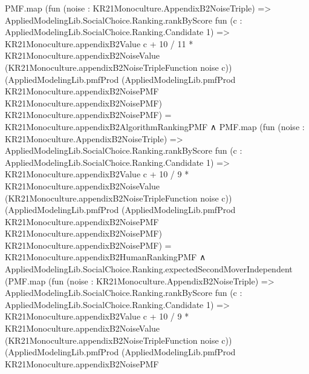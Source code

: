 \documentclass[10pt]{article}
\begin{document}
\begin{ReviewVerbatim}
                  PMF.map
                        (fun (noise : KR21Monoculture.AppendixB2NoiseTriple) =>
                          AppliedModelingLib.SocialChoice.Ranking.rankByScore
                            fun (c : AppliedModelingLib.SocialChoice.Ranking.Candidate 1) =>
                            KR21Monoculture.appendixB2Value c +
                              10 / 11 *
                                KR21Monoculture.appendixB2NoiseValue
                                  (KR21Monoculture.appendixB2NoiseTripleFunction noise c))
                        (AppliedModelingLib.pmfProd
                          (AppliedModelingLib.pmfProd KR21Monoculture.appendixB2NoisePMF
                            KR21Monoculture.appendixB2NoisePMF)
                          KR21Monoculture.appendixB2NoisePMF) =
                      KR21Monoculture.appendixB2AlgorithmRankingPMF ∧
                    PMF.map
                          (fun (noise : KR21Monoculture.AppendixB2NoiseTriple) =>
                            AppliedModelingLib.SocialChoice.Ranking.rankByScore
                              fun (c : AppliedModelingLib.SocialChoice.Ranking.Candidate 1) =>
                              KR21Monoculture.appendixB2Value c +
                                10 / 9 *
                                  KR21Monoculture.appendixB2NoiseValue
                                    (KR21Monoculture.appendixB2NoiseTripleFunction noise c))
                          (AppliedModelingLib.pmfProd
                            (AppliedModelingLib.pmfProd KR21Monoculture.appendixB2NoisePMF
                              KR21Monoculture.appendixB2NoisePMF)
                            KR21Monoculture.appendixB2NoisePMF) =
                        KR21Monoculture.appendixB2HumanRankingPMF ∧
                      AppliedModelingLib.SocialChoice.Ranking.expectedSecondMoverIndependent
                              (PMF.map
                                (fun (noise : KR21Monoculture.AppendixB2NoiseTriple) =>
                                  AppliedModelingLib.SocialChoice.Ranking.rankByScore
                                    fun (c : AppliedModelingLib.SocialChoice.Ranking.Candidate 1) =>
                                    KR21Monoculture.appendixB2Value c +
                                      10 / 9 *
                                        KR21Monoculture.appendixB2NoiseValue
                                          (KR21Monoculture.appendixB2NoiseTripleFunction noise c))
                                (AppliedModelingLib.pmfProd
                                  (AppliedModelingLib.pmfProd KR21Monoculture.appendixB2NoisePMF

\end{ReviewVerbatim}
\end{document}
